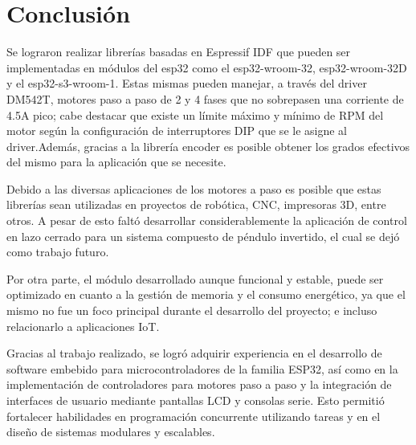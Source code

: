 %
\chapter{Conclusión}\label{chap:conclusion}

Se lograron realizar librerías basadas en Espressif IDF que pueden ser implementadas en módulos del esp32 como el esp32-wroom-32, esp32-wroom-32D y el esp32-s3-wroom-1. Estas mismas pueden manejar, a través del driver DM542T, motores paso a paso de 2 y 4 fases que no sobrepasen una corriente de 4.5A pico; cabe destacar que existe un límite máximo y mínimo de RPM del motor según la configuración de interruptores DIP que se le asigne al driver.Además, gracias a la librería encoder es posible obtener los grados efectivos del mismo para la aplicación que se necesite.

Debido a las diversas aplicaciones de los motores a paso es posible que estas librerías sean utilizadas en proyectos de robótica, CNC, impresoras 3D, entre otros. A pesar de esto faltó desarrollar considerablemente la aplicación de control en lazo cerrado para un sistema compuesto de péndulo invertido, el cual se dejó como trabajo futuro.

Por otra parte, el módulo desarrollado aunque funcional y estable, puede ser optimizado en cuanto a la gestión de memoria y el consumo energético, ya que el mismo no fue un foco principal durante el desarrollo del proyecto; e incluso relacionarlo a aplicaciones IoT.

Gracias al trabajo realizado, se logró adquirir experiencia en el desarrollo de software embebido para microcontroladores de la familia ESP32, así como en la implementación de controladores para motores paso a paso y la integración de interfaces de usuario mediante pantallas LCD y consolas serie. Esto permitió fortalecer habilidades en programación concurrente utilizando tareas y en el diseño de sistemas modulares y escalables.